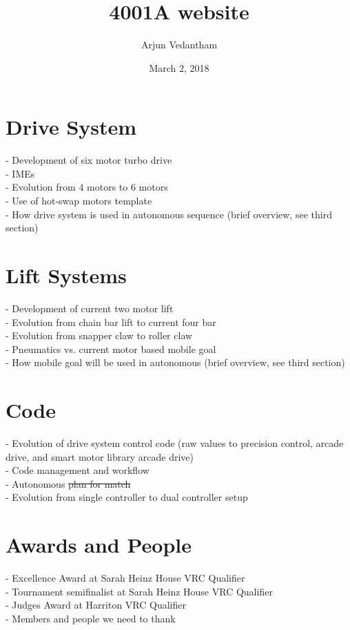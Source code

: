 \documentclass[11pt]{article}
\title{\textbf{4001A website}}
\author{Arjun Vedantham}
\date{March 2, 2018}
\begin{document}
\maketitle

\section{Drive System}

 - Development of six motor turbo drive\\
 - IMEs\\
 - Evolution from 4 motors to 6 motors\\
 - Use of hot-swap motors template\\
 - How drive system is used in autonomous sequence (brief overview, see third section)

\section{Lift Systems}
 - Development of current two motor lift\\
 - Evolution from chain bar lift to current four bar\\
 - Evolution from snapper claw to roller claw\\
 - Pneumatics vs. current motor based mobile goal\\
 - How mobile goal will be used in autonomous (brief overview, see third section)

\section{Code}
 - Evolution of drive system control code (raw values to precision control, arcade drive, and smart motor library arcade drive)\\
 - Code management and workflow\\
 - Autonomous \sout{plan for match}\\
 - Evolution from single controller to dual controller setup
 
\section{Awards and People}
 -  Excellence Award at Sarah Heinz House VRC Qualifier\\
 -  Tournament semifinalist at Sarah Heinz House VRC Qualifier\\
 -  Judges Award at Harriton VRC Qualifier\\
 -  Members and people we need to thank
\end{document}
